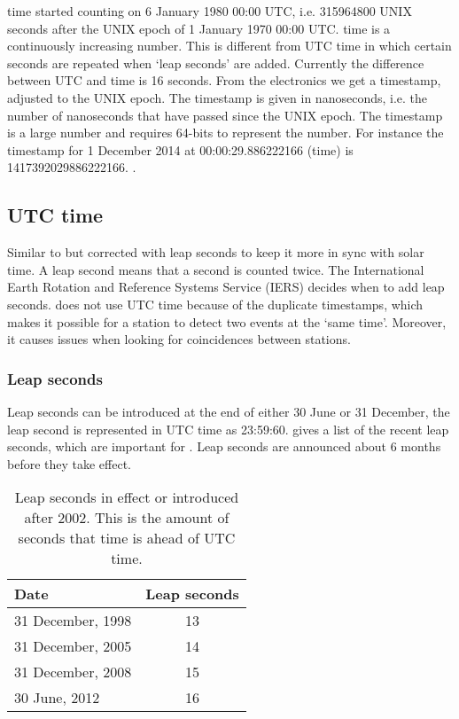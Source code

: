 \gps time started counting on 6 January 1980 00:00 UTC, i.e.
\num{315964800} UNIX seconds after the UNIX epoch of 1 January 1970
00:00 UTC. \gps time is a continuously increasing number. This is
different from UTC time in which certain seconds are repeated when `leap
seconds' are added. Currently the difference between UTC and \gps time
is 16 seconds. From the \hisparc electronics we get a \gps timestamp,
adjusted to the UNIX epoch. The timestamp is given in nanoseconds, i.e.
the number of nanoseconds that have passed since the UNIX epoch. The
\gps timestamp is a large number and requires 64-bits to represent the
number. For instance the \gps timestamp for 1 December 2014 at
00:00:29.886222166 (\gps time) is \num{1417392029886222166}.
\cite{usno:2012aa}.


\subsection{UTC time}

Similar to \gps but corrected with leap seconds to keep it more in sync
with solar time. A leap second means that a second is counted twice. The
International Earth Rotation and Reference Systems Service (IERS)
decides when to add leap seconds. \hisparc does not use UTC time because
of the duplicate timestamps, which makes it possible for a station to
detect two events at the `same time'. Moreover, it causes issues when
looking for coincidences between stations.


\subsubsection{Leap seconds}

Leap seconds can be introduced at the end of either 30 June or 31
December, the leap second is represented in UTC time as 23:59:60.
 gives a list of the recent leap seconds,
which are important for \hisparc. Leap seconds are announced about 6
months before they take effect.

\begin{table}
    \centering
    \begin{tabular}{ l | c }
        Date & Leap seconds \\
        \hline
        31 December, 1998 & 13 \\
        31 December, 2005 & 14 \\
        31 December, 2008 & 15 \\
        30 June, 2012 & 16 \\
        \hline
    \end{tabular}
   \caption{Leap seconds in effect or introduced after 2002. This is the
            amount of seconds that \gps time is ahead of UTC time.}
   \label{table:leapseconds}
\end{table}


